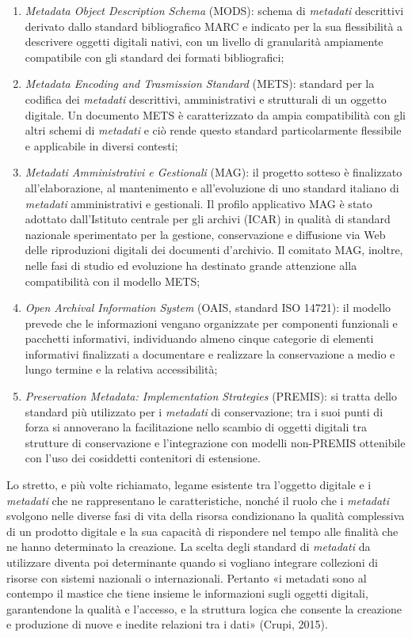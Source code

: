 \documentclass[
  b5paper,
  twoside,
  12pt,
  chapterprefix=false,
  bibliography=totocnumbered,
  parskip=false]{scrbook}
\begin{document}
\begin{enumerate}
\def\labelenumi{\arabic{enumi}.}
\item
  \emph{Metadata Object Description Schema} (MODS): schema di \emph{metadati}
  descrittivi derivato dallo standard bibliografico MARC e indicato
  per la sua flessibilità a descrivere oggetti digitali nativi, con un
  livello di granularità ampiamente compatibile con gli standard dei
  formati bibliografici;
\item
  \emph{Metadata Encoding and Trasmission Standard} (METS): standard per la
  codifica dei \emph{metadati} descrittivi, amministrativi e strutturali di
  un oggetto digitale. Un documento METS è caratterizzato da ampia
  compatibilità con gli altri schemi di \emph{metadati} e ciò rende questo
  standard particolarmente flessibile e applicabile in diversi
  contesti;
\item
  \emph{Metadati Amministrativi e Gestionali} (MAG): il progetto sotteso è
  finalizzato all'elaborazione, al mantenimento e all'evoluzione di
  uno standard italiano di \emph{metadati} amministrativi e gestionali. Il
  profilo applicativo MAG è stato adottato dall'Istituto centrale per
  gli archivi (ICAR) in qualità di standard nazionale sperimentato per
  la gestione, conservazione e diffusione via Web delle riproduzioni
  digitali dei documenti d'archivio. Il comitato MAG, inoltre, nelle
  fasi di studio ed evoluzione ha destinato grande attenzione alla
  compatibilità con il modello METS;
\item
  \emph{Open Archival Information System} (OAIS, standard ISO 14721): il
  modello prevede che le informazioni vengano organizzate per
  componenti funzionali e pacchetti informativi, individuando almeno
  cinque categorie di elementi informativi finalizzati a documentare e
  realizzare la conservazione a medio e lungo termine e la relativa
  accessibilità;
\item
  \emph{Preservation Metadata: Implementation Strategies} (PREMIS): si
  tratta dello standard più utilizzato per i \emph{metadati} di
  conservazione; tra i suoi punti di forza si annoverano la
  facilitazione nello scambio di oggetti digitali tra strutture di
  conservazione e l'integrazione con modelli non-PREMIS ottenibile con
  l'uso dei cosiddetti contenitori di estensione.
\end{enumerate}

Lo stretto, e più volte richiamato, legame esistente tra l'oggetto
digitale e i \emph{metadati} che ne rappresentano le caratteristiche, nonché
il ruolo che i \emph{metadati} svolgono nelle diverse fasi di vita della
risorsa condizionano la qualità complessiva di un prodotto digitale e la
sua capacità di rispondere nel tempo alle finalità che ne hanno
determinato la creazione. La scelta degli standard di \emph{metadati} da
utilizzare diventa poi determinante quando si vogliano integrare
collezioni di risorse con sistemi nazionali o internazionali. Pertanto
«i metadati sono al contempo il mastice che tiene insieme le
informazioni sugli oggetti digitali, garantendone la qualità e
l'accesso, e la struttura logica che consente la creazione e produzione
di nuove e inedite relazioni tra i dati» (Crupi, 2015).
\end{document}
